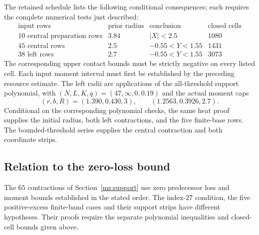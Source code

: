 The retained schedule lists the following conditional consequences; each
requires the complete numerical tests just described:
\[
\begin{array}{l|c|c|r}
\text{input rows}&\text{prior radius}&\text{conclusion}&\text{closed cells}\\\hline
10\text{ central preparation rows}&3.84&|X|<2.5&1080\\
45\text{ central rows}&2.5&-0.55<Y<1.55&1431\\
38\text{ left rows}&2.7&-0.55<Y<1.55&3073
\end{array}
\]
The corresponding upper contact bounds must be strictly negative on
every listed cell. Each input moment interval must first be established
by the preceding resource estimate.
The left radii are applications of the all-threshold support polynomial,
with $(N,L,K,q)=(47,\infty,0,0.19)$ and the actual moment caps
\[
 (r,b,R)=(1.390,0.430,3),\qquad (1.2563,0.3926,2.7).
\]
Conditional on the corresponding polynomial checks, the same heat proof
supplies the initial radius, both left contractions, and the five finite-base rows. The bounded-threshold
series supplies the central contraction and both coordinate strips.

\subsection{Relation to the zero-loss bound}
\label{ms:legacy-support:retention}

The $65$ contractions of Section~\ref{ms:support} use zero predecessor
loss and moment bounds established in the stated order. The index-$27$
condition, the five positive-excess finite-band cases and their support
strips have different hypotheses. Their proofs require the separate
polynomial inequalities and closed-cell bounds given above.
